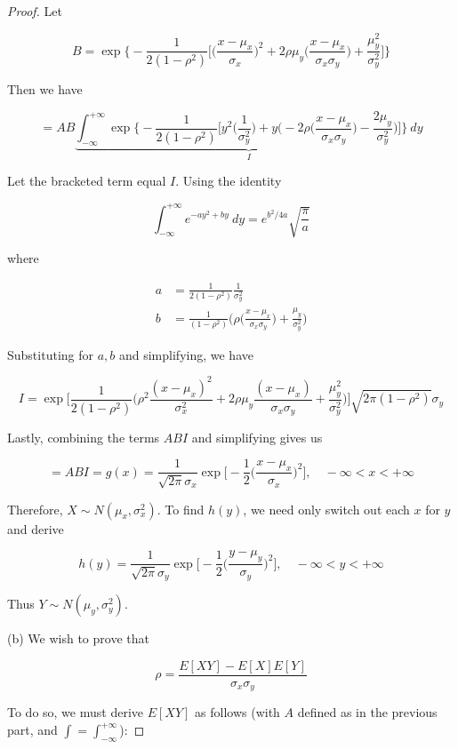 \documentclass[10pt, oneside]{article}
\begin{document}
\begin{enumerate}[label=9.\arabic*]
\begin{proof}
Let

\[ B = \exp \bigg\{-\frac{1}{2(1-\rho^2)} \bigg[ \bigg( \frac{x - \mu_x}{\sigma_x} \bigg)^2 + 2 \rho \mu_y \bigg( \frac{x - \mu_x}{\sigma_x \sigma_y} \bigg) + \frac{\mu^2_y}{\sigma^2_y} \bigg] \bigg\} \]

Then we have

\[ = AB \underbrace{\int^{+\infty}_{-\infty} \exp \bigg\{ -\frac{1}{2(1-\rho^2)} \bigg[ y^2 \bigg( \frac{1}{\sigma^2_y} \bigg) + y \bigg( -2\rho \bigg( \frac{x-\mu_x}{\sigma_x \sigma_y} \bigg) - \frac{2\mu_y}{\sigma^2_y} \bigg) \bigg] \bigg\} \ dy}_{I} \]

Let the bracketed term equal $I$. Using the identity

\[ \int^{+\infty}_{-\infty} e^{-ay^2 + by} \ dy = e^{b^2/4a} \sqrt{\frac{\pi}{a}} \]

where

\begin{align*}
a &= \frac{1}{2(1-\rho^2)} \frac{1}{\sigma^2_y} \\
b &= \frac{1}{(1-\rho^2)} \bigg( \rho \bigg( \frac{x-\mu_x}{\sigma_x \sigma_y} \bigg) + \frac{\mu_y}{\sigma^2_y} \bigg)
\end{align*}

Substituting for $a, b$ and simplifying, we have

\[ I = \exp \bigg[ \frac{1}{2(1-\rho^2)} \bigg( \rho^2 \frac{(x-\mu_x)^2}{\sigma^2_x} + 2\rho \mu_y \frac{(x-\mu_x)}{\sigma_x \sigma_y} + \frac{\mu^2_y}{\sigma^2_y} \bigg) \bigg] \sqrt{2\pi (1-\rho^2)} \sigma_y \]

Lastly, combining the terms $ABI$ and simplifying gives us

\[ = ABI = \boxed{ g(x) = \frac{1}{\sqrt{2\pi} \sigma_x} \exp \bigg[ -\frac{1}{2} \bigg( \frac{x-\mu_x}{\sigma_x} \bigg)^2 \bigg], \quad -\infty < x < +\infty } \]

Therefore, $\boxed{X \sim N(\mu_x, \sigma^2_x)}$. To find $h(y)$, we need only switch out each $x$ for $y$ and derive

\[ \boxed{ h(y) = \frac{1}{\sqrt{2\pi} \sigma_y} \exp \bigg[ -\frac{1}{2} \bigg( \frac{y-\mu_y}{\sigma_y} \bigg)^2 \bigg], \quad -\infty < y < +\infty } \]

Thus $\boxed{Y \sim N(\mu_y, \sigma^2_y)}$.

(b) We wish to prove that

\[ \rho = \frac{E[XY] - E[X]E[Y]}{\sigma_x \sigma_y} \]

To do so, we must derive $E[XY]$ as follows (with $A$ defined as in the previous part, and $\int = \int^{+\infty}_{-\infty}$):


\end{proof}
\end{enumerate}
\end{document}

